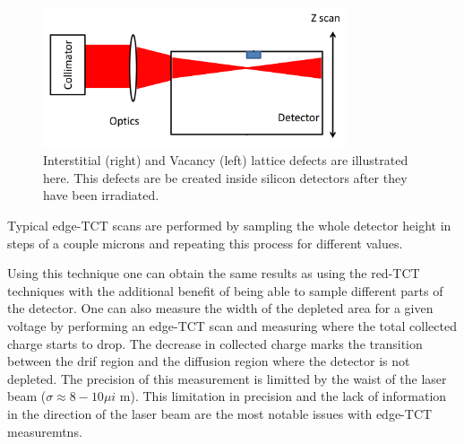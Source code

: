 \begin{figure}[H]
	\centering
	\includegraphics[width=0.8\textwidth]{chap4_eTCT.png}
	\caption{Interstitial (right) and Vacancy (left) lattice defects are illustrated here. This defects are be created inside silicon detectors after they have been irradiated.}
	\label{fig:eTCT}
\end{figure}


Typical edge-TCT scans are performed by sampling the whole detector height in steps of a couple microns and repeating this process for different \vias values.

Using this technique one can obtain the same results as using the red-TCT techniques with the additional benefit of being able to sample different parts of the detector. One can also measure the width of the depleted area for a given voltage by performing an edge-TCT scan and measuring where the total 
collected charge starts to drop. The decrease in collected charge marks the transition between the drif region and the diffusion region where the detector is not depleted. The precision of this measurement is limitted by the waist of the laser beam ($ \sigma \approx 8-10 \mu i $ m). This limitation in precision and the lack of information in the direction of the laser beam are the most notable issues with edge-TCT measuremtns.

